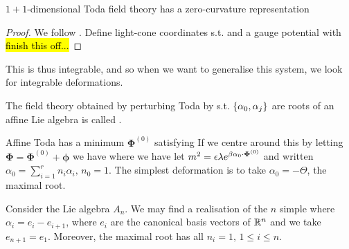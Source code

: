 \documentclass{article}
\begin{document}
\begin{prop}
	$1+1$-dimensional Toda field theory has a zero-curvature representation 
\end{prop}
\begin{proof}
	We follow \cite{Olive1983}. Define light-cone coordinates
s.t. 
and a gauge potential with 
\hl{finish this off...}
\end{proof}

This is thus integrable, and so when we want to generalise this system, we look for integrable deformations. 

\begin{definition}
	The field theory obtained by perturbing Toda by 
s.t. $\left\{ \alpha_0, \alpha_j \right\}$ are roots of an affine Lie algebra is called . 
\end{definition}

Affine Toda has a minimum $\bm{\Phi}^{(0)}$ satisfying 
If we centre around this by letting $\bm{\Phi} = \bm{\Phi}^{(0)} + \bm{\phi}$ we have 
where we have let $m^2 = \epsilon \lambda e^{\beta \alpha_0 \cdot \bm{\Phi}^{(0)}}$ and written $\alpha_0 = \sum_{i=1}^r n_i \alpha_i, \, n_0=1$. The simplest deformation is to take $\alpha_0 = -\Theta$, the maximal root.  

\begin{example}
	Consider the Lie algebra $A_n$. We may find a realisation of the $n$ simple where $\alpha_i = e_i - e_{i+1}$, where $e_i$ are the canonical basis vectors of $\mathbb{R}^n$ and we take $e_{n+1}=e_1$. Moreover, the maximal root has all $n_i=1, \, 1\leq i \leq n$. 
\end{example}
\end{document}
